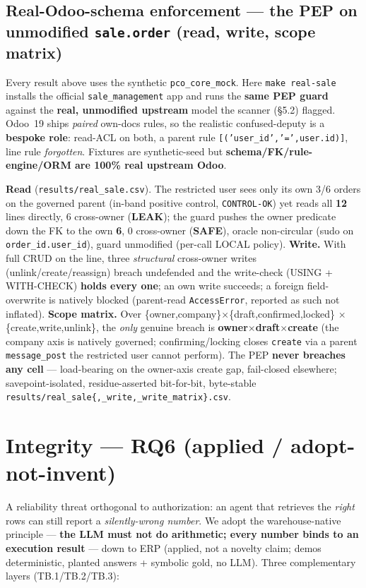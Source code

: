 \documentclass[runningheads]{llncs}
\newcommand{\code}[1]{\texttt{#1}}
\begin{document}
\subsection{Real-Odoo-schema enforcement --- the PEP on unmodified \code{sale.order} (read, write, scope matrix)}
Every result above uses the synthetic \code{pco\_core\_mock}. Here \code{make real-sale} installs the official
\code{sale\_management} app and runs the \textbf{same PEP guard} against the \textbf{real, unmodified upstream}
model the scanner (\S5.2) flagged. Odoo~19 ships \emph{paired} own-docs rules, so the realistic confused-deputy is
a \textbf{bespoke role}: read-ACL on both, a parent rule \code{[('user\_id','=',user.id)]}, line rule
\emph{forgotten}. Fixtures are synthetic-seed but \textbf{schema/FK/rule-engine/ORM are 100\% real upstream Odoo}.

\textbf{Read} (\code{results/real\_sale.csv}). The restricted user sees only its own 3/6 orders on the governed
parent (in-band positive control, \code{CONTROL-OK}) yet reads all \textbf{12} lines directly, 6 cross-owner
(\textbf{LEAK}); the guard pushes the owner predicate down the FK to the own \textbf{6}, 0 cross-owner
(\textbf{SAFE}), oracle non-circular (sudo on \code{order\_id.user\_id}), guard unmodified (per-call LOCAL policy). \textbf{Write.} With full CRUD on the line, three \emph{structural}
cross-owner writes (unlink/create/reassign) breach undefended and the write-check (USING + WITH-CHECK) \textbf{holds
every one}; an own write succeeds; a foreign field-overwrite is natively blocked (parent-read \code{AccessError},
reported as such not inflated). \textbf{Scope matrix.} Over \{owner,company\}$\times$\{draft,confirmed,locked\}
$\times$\{create,write,unlink\}, the \emph{only} genuine breach is \textbf{owner$\times$draft$\times$create} (the
company axis is natively governed; confirming/locking closes \code{create} via a parent \code{message\_post} the
restricted user cannot perform). The PEP \textbf{never breaches any cell} --- load-bearing on the owner-axis create
gap, fail-closed elsewhere; savepoint-isolated, residue-asserted bit-for-bit, byte-stable
\code{results/real\_sale\{,\_write,\_write\_matrix\}.csv}.

\section{Integrity --- RQ6 (applied / adopt-not-invent)}
A reliability threat orthogonal to authorization: an agent that retrieves the \emph{right} rows can still report a
\emph{silently-wrong number}. We adopt the warehouse-native principle --- \textbf{the LLM must not do arithmetic;
every number binds to an execution result} --- down to ERP (applied, not a novelty claim; demos deterministic,
planted answers + symbolic gold, no LLM). Three complementary layers (TB.1/TB.2/TB.3):
\end{document}
